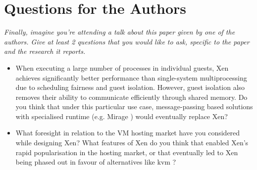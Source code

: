 \documentclass[11pt]{article}
\begin{document}
\section*{Questions for the Authors}
\textsl{Finally, imagine you're attending a talk about this paper given by one of the authors. Give at least 2 questions that you would like to ask, specific to the paper and the research it reports.}


\begin{itemize}
	\item When executing a large number of processes in individual guests, Xen achieves significantly better performance than single-system multiprocessing due to scheduling fairness and guest isolation. However, guest isolation also removes their ability to communicate efficiently through shared memory. Do you think that under this particular use case, message-passing based solutions with specialised runtime (e.g. Mirage \cite{madhavapeddy2013unikernels}) would eventually replace Xen?
	\item What foresight in relation to the VM hosting market have you considered while designing Xen? What features of Xen do you think that enabled Xen's rapid popularisation in the hosting market, or that eventually led to Xen being phased out in favour of alternatives like kvm \cite{kivity2007kvm}?
\end{itemize}


\footnotesize{}
\end{document}
